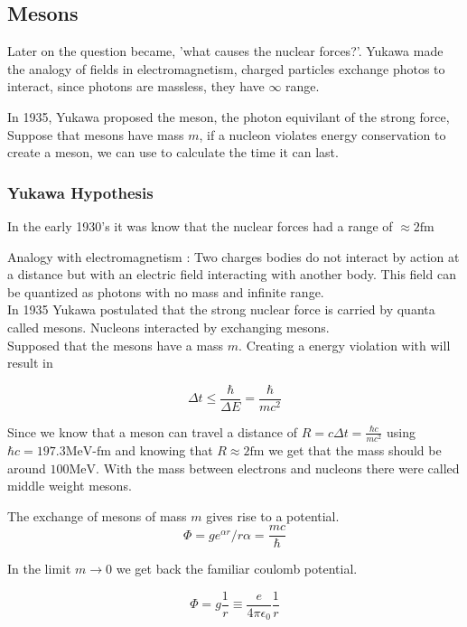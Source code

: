 \documentclass[english, 11pt]{article}
\begin{document}
\subsection{Mesons}

Later on the question became, 'what causes the nuclear forces?'. Yukawa made the analogy of fields in electromagnetism, charged particles exchange photos to interact, since photons are massless, they have $\infty$ range.

In 1935, Yukawa proposed the meson, the photon equivilant of the strong force, Suppose that mesons have mass $m$, if a nucleon violates energy conservation to create a meson, we can use  to calculate the time it can last.

\subsubsection{Yukawa Hypothesis}

In the early 1930's it was know that the nuclear forces had a range of $\approx 2\text{fm}$

Analogy with electromagnetism : Two charges bodies do not interact by action at a distance but with an electric field interacting with another body. This field can be quantized as photons with no mass and infinite range.\\
In 1935 Yukawa postulated that the strong nuclear force is carried by quanta called mesons. Nucleons interacted by exchanging mesons.\\
Supposed that the mesons have a mass $m$. Creating a energy violation with  will result in

\[ \Delta t \le \frac{\hbar}{\Delta E} = \frac{\hbar}{mc^2}\]

Since we know that a meson can travel a distance of $R = c\Delta t = \frac{\hbar c}{mc^2}$ using $\hbar c = 197.3 \text{MeV-fm}$ and knowing that $R \approx 2 \text{fm}$ we get that the mass should be around $100 \text{MeV}$. With the mass between electrons and nucleons there were called middle weight mesons.

\begin{defn}\label{yp}
  The exchange of mesons of mass $m$ gives rise to a potential.
  \[ \Phi = ge^{\alpha r}/r \alpha = \frac{mc}{\hbar} \]
\end{defn}

In the limit $m\rightarrow0$ we get back the familiar coulomb potential.

\[ \Phi = g \frac{1}{r} \equiv \frac{e}{4\pi\epsilon_0}\frac{1}{r}\]
\end{document}
